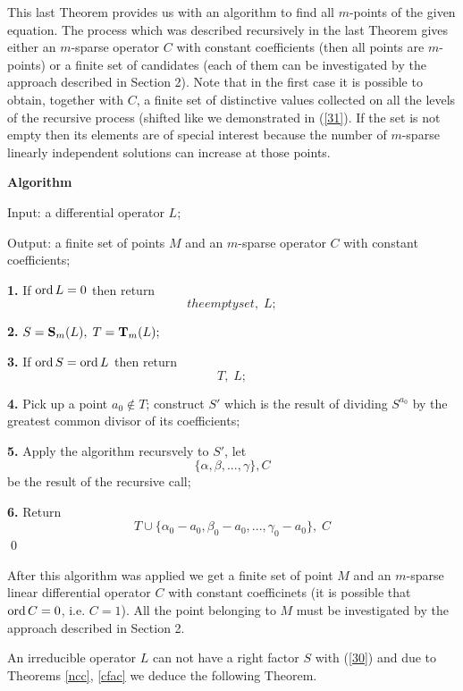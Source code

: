 {{This last Theorem provides us with an algorithm to find all
$m$-points of the given equation. The process which was described
recursively in the last Theorem gives either an $m$-sparse operator
$C$ with constant coefficients (then all points are $m$-points) or
a finite set of candidates (each of them can be investigated by
the approach described in Section 2). Note that
in the first case it is possible to obtain, together with $C$,
a finite set of distinctive values collected on all the
levels of the recursive process (shifted like we demonstrated in
(\ref{31}). If the set is not empty then its
elements are of special interest because the number of $m$-sparse
linearly independent solutions can increase at those points.


{\bf Algorithm}

Input: a differential operator $L$;

Output: a finite set of points $M$ and an $m$-sparse operator $C$ 
with constant coefficients;

{\bf 1.} If $\mathop{\rm ord} L=0$ then return
$$the empty set,\; L;$$

{\bf 2.} $S={\bf S}_m(L),\;T={\bf T}_m(L);$

{\bf 3.} If $\mathop{\rm ord} S=\mathop{\rm ord} L$ then return
$$T,\;L;$$

{\bf 4.} Pick up a point $a_0\notin T$; construct $S'$ which is the 
result of dividing $S^{a_0}$  by the greatest common divisor of its 
coefficients; 

{\bf 5.} Apply the algorithm recursvely to $S'$, let
$$  \{\alpha ,\beta ,...,\gamma \}, C$$
be the result of the recursive call;

{\bf 6.} Return
$$T \cup \{\alpha _0-a_0,\beta _0-a_0,...,\gamma _0-a_0\},\;C$$ \qed

After this algorithm was applied we get a finite set of point $M$ and 
an $m$-sparse linear differential operator $C$ with constant 
coefficinets (it is possible that $\mathop{\rm ord} C=0$, i.e. $C=1$). All the 
point belonging to $M$ must be investigated by the approach described 
in Section 2.

An irreducible operator $L$ can not have a right factor $S$ with
(\ref{30}) and due to Theorems \ref{ncc}, \ref{cfac}
we deduce the following Theorem.


}}
